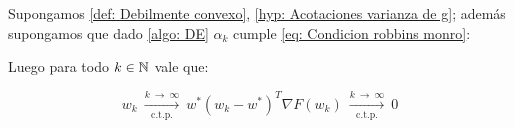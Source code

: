 \begin{theorem}
	\label{theorem: DE en debilmente convexo y alfa decreciente converge ctp}
	Supongamos \ref{def: Debilmente convexo}, \ref{hyp: Acotaciones varianza de g}; adem\'as supongamos que dado \ref{algo: DE} $\alpha_k$ cumple \ref{eq: Condicion robbins monro}:
	
	Luego para todo $k \in {\mathbb{N}}$ vale que:
	
	\begin{subequations}
		\begin{equation}
			w_k \ \xrightarrow[\text{c.t.p.}]{k \ \rightarrow \ \infty } \ w^*
		\end{equation}
		\begin{equation}
			\left(w_k - w^*\right)^T \nabla F(w_k) \ \xrightarrow[\text{c.t.p.}]{k \ \rightarrow \ \infty } \ 0
		\end{equation}
	\end{subequations}
	
\end{theorem}


